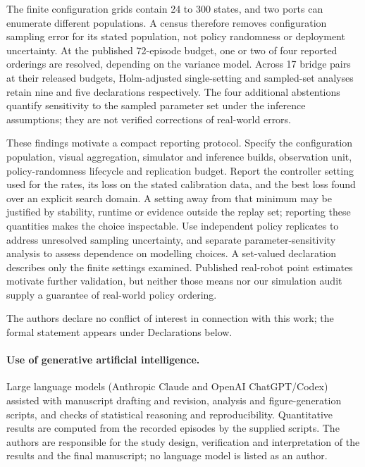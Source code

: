 \documentclass[pdflatex,iicol,sn-apa]{sn-jnl}
\theoremstyle{remark}
\begin{document}
The finite configuration grids contain 24 to 300 states, and two ports can enumerate different
populations. A census therefore removes configuration sampling error for its stated population,
not policy randomness or deployment uncertainty. At the published 72-episode budget, one or two
of four reported orderings are resolved, depending on the variance model. Across 17 bridge pairs
at their released budgets, Holm-adjusted single-setting and sampled-set analyses retain nine and
five declarations respectively. The four additional abstentions quantify sensitivity to the sampled
parameter set under the inference assumptions; they are not verified corrections of real-world errors.

These findings motivate a compact reporting protocol. Specify the configuration population, visual
aggregation, simulator and inference builds, observation unit, policy-randomness lifecycle and
replication budget. Report the controller setting used for the rates, its loss on the stated
calibration data, and the best loss found over an explicit search domain. A setting away from that
minimum may be justified by stability, runtime or evidence outside the replay set; reporting these
quantities makes the choice inspectable. Use independent policy replicates to address unresolved
sampling uncertainty, and separate parameter-sensitivity analysis to assess dependence on modelling
choices. A set-valued declaration describes only the finite settings examined. Published real-robot
point estimates motivate further validation, but neither those means nor our simulation audit supply
a guarantee of real-world policy ordering.


The authors declare no conflict of interest in connection with this work; the formal statement
appears under Declarations below.

\paragraph{Use of generative artificial intelligence.}
Large language models (Anthropic Claude and OpenAI ChatGPT/Codex) assisted with manuscript drafting
and revision, analysis and figure-generation scripts, and checks of statistical reasoning and
reproducibility. Quantitative results are computed from the recorded episodes by the supplied
scripts. The authors are responsible for the study design, verification and interpretation of the
results and the final manuscript; no language model is listed as an author.
\end{document}
